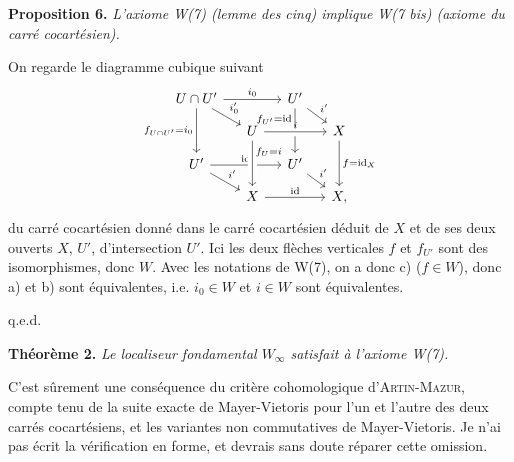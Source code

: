 
\textbf{Proposition 6.} \textit{L'axiome \textup{W(7)} (lemme des cinq) implique \textup{W(7 bis)} (axiome du carré cocartésien).}

On regarde le diagramme cubique suivant
\[
\begin{tikzcd}[row sep=small, column sep=small]
U\cap U' \arrow[rr, "i_0"] \arrow[dr, "i'_0"] \arrow[dd, "f_{U\cap U'}=i_0"'] & & U' \arrow[dr, "i'"] \arrow[dd, "f_{U'}=\mathrm{id}"{swap,pos=.25}] & \\
& U \arrow[rr, crossing over, "i"] & & X \arrow[dd, "f=\mathrm{id}_X"] \\
U' \arrow[rr, "\mathrm{id}"] \arrow[dr, "i'"] & & U' \arrow[dr, "i'"] & \\
& X \arrow[rr, "\mathrm{id}"] \arrow[from=uu, crossing over, "f_U=i"{pos=.25}] & & X,
\end{tikzcd}
\]
du carré cocartésien donné dans le carré cocartésien déduit de $X$ et de ses deux ouverts $X$, $U'$, d'intersection $U'$. Ici les deux flèches verticales $f$ et $f_{U'}$ sont des isomorphismes, donc $W$. Avec les notations de W(7), on a donc c) ($f\in W$), donc a) et b) sont équivalentes, i.e. $i_0\in W$ et $i\in W$ sont équivalentes.

\hfill q.e.d.

\textbf{Théorème 2.} \textit{Le localiseur fondamental $W_\infty$ satisfait à l'axiome \textup{W(7)}.}

C'est sûrement une conséquence du critère cohomologique d'\textsc{Artin-Mazur}, compte tenu de la suite exacte de Mayer-Vietoris pour l'un et l'autre des deux carrés cocartésiens, et les variantes non commutatives de Mayer-Vietoris. Je n'ai pas écrit la vérification en forme, et devrais sans doute réparer cette omission.

